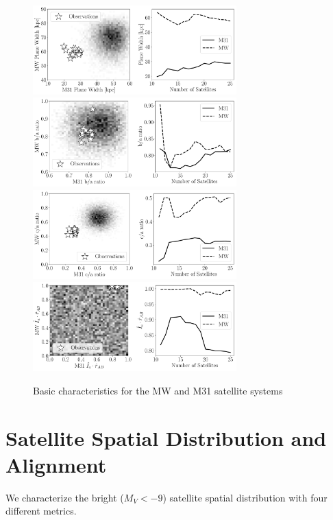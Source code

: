 \documentclass[a4paper,fleqn,usenatbib]{mnras}
\begin{document}
\begin{figure}
\centering
\includegraphics[width=0.7\textwidth]{planewidth_lg.pdf}
\includegraphics[width=0.7\textwidth]{ba_ratio_lg.pdf}
\includegraphics[width=0.7\textwidth]{ca_ratio_lg.pdf}
\includegraphics[width=0.7\textwidth]{mu_lg.pdf}
\caption{Basic characteristics for the MW and M31 satellite systems
\label{fig:general}}
\end{figure}




\section{Satellite Spatial Distribution and Alignment}
\label{sec:SpatialMeasurements}

We characterize the bright ($M_V<-9$) satellite spatial distribution
with four different metrics. 
\end{document}
